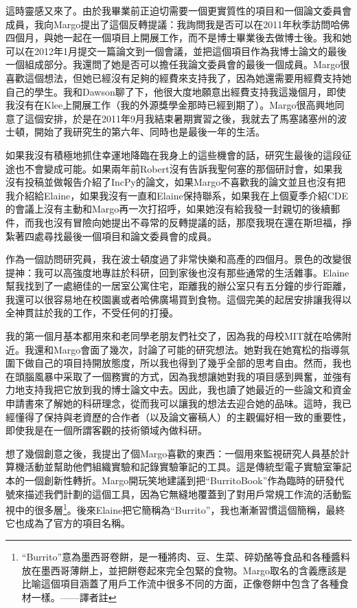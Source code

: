 \documentclass[12pt,UTF8,nofonts]{book}
\begin{document}
這時靈感又來了。由於我畢業前正迫切需要一個更實質性的項目和一個論文委員會成員，我向Margo提出了這個反轉提議：我詢問我是否可以在2011年秋季訪問哈佛四個月，與她一起在一個項目上開展工作，而不是博士畢業後去做博士後。我和她可以在2012年1月提交一篇論文到一個會議，並把這個項目作為我博士論文的最後一個組成部分。我還問了她是否可以擔任我論文委員會的最後一個成員。Margo很喜歡這個想法，但她已經沒有足夠的經費來支持我了，因為她還需要用經費支持她自己的學生。我和Dawson聊了下，他很大度地願意出經費支持我這幾個月，即使我沒有在Klee上開展工作（我的外源獎學金那時已經到期了）。Margo很高興地同意了這個安排，於是在2011年9月我結束暑期實習之後，我就去了馬塞諸塞州的波士頓，開始了我研究生的第六年、同時也是最後一年的生活。

如果我沒有積極地抓住幸運地降臨在我身上的這些機會的話，研究生最後的這段征途也不會變成可能。如果兩年前Robert沒有告訴我聖何塞的那個研討會，如果我沒有投稿並做報告介紹了IncPy的論文，如果Margo不喜歡我的論文並且也沒有把我介紹給Elaine，如果我沒有一直和Elaine保持聯系，如果我在上個夏季介紹CDE的會議上沒有主動和Margo再一次打招呼，如果她沒有給我發一封親切的後續郵件，而我也沒有冒險向她提出不尋常的反轉提議的話，那麼我現在還在斯坦福，掙紮著四處尋找最後一個項目和論文委員會的成員。

\breakline

作為一個訪問研究員，我在波士頓度過了非常快樂和高產的四個月。景色的改變很提神：我可以高強度地專註於科研，回到家後也沒有那些通常的生活雜事。Elaine幫我找到了一處絕佳的一居室公寓住宅，距離我的辦公室只有五分鐘的步行距離，我還可以很容易地在校園裏或者哈佛廣場買到食物。這個完美的起居安排讓我得以全神貫註於我的工作，不受任何的打擾。

我的第一個月基本都用來和老同學老朋友們社交了，因為我的母校MIT就在哈佛附近。我還和Margo會面了幾次，討論了可能的研究想法。她對我在她寬松的指導氛圍下做自己的項目持開放態度，所以我也得到了幾乎全部的思考自由。然而，我也在頭腦風暴中采取了一個務實的方式，因為我想讓她對我的項目感到興奮，並強有力地支持我把它放到我的博士論文中去。因此，我也讀了她最近的一些論文和資金申請書來了解她的科研理念，從而我可以讓我的想法去迎合她的品味。這時，我已經懂得了保持與老資歷的合作者（以及論文審稿人）的主觀偏好相一致的重要性，即使我是在一個所謂客觀的技術領域內做科研。

想了幾個創意之後，我提出了個Margo喜歡的東西：一個用來監視研究人員基於計算機活動並幫助他們組織實驗和記錄實驗筆記的工具。這是傳統型電子實驗室筆記本的一個創新性轉折。Margo開玩笑地建議到把“BurritoBook”作為臨時的研發代號來描述我們計劃的這個工具，因為它無縫地覆蓋到了對用戶常規工作流的活動監視中的很多層\footnote{``Burrito''意為墨西哥卷餅，是一種將肉、豆、生菜、碎奶酪等食品和各種醬料放在墨西哥薄餅上，並把餅卷起來完全包緊的食物。Margo取名的含義應該是比喻這個項目涵蓋了用戶工作流中很多不同的方面，正像卷餅中包含了各種食材一樣。——譯者註}。後來Elaine把它簡稱為“Burrito”，我也漸漸習慣這個簡稱，最終它也成為了官方的項目名稱。
\end{document}
